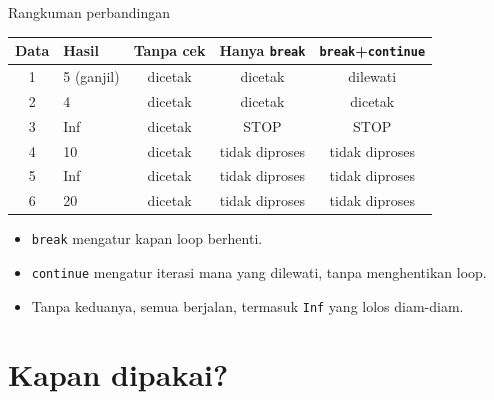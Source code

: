 \documentclass[aspectratio=169,10pt]{beamer}
\newcommand{\kode}[1]{\texttt{#1}}
\begin{document}
\begin{frame}[fragile]{Rangkuman perbandingan}
  \centering
  \begin{tabular}{@{}clccc@{}}
    \toprule
    Data & Hasil & Tanpa cek & Hanya \kode{break} & \kode{break}+\kode{continue} \\
    \midrule
    1 & 5 (ganjil) & dicetak & dicetak & \alert{dilewati} \\
    2 & 4          & dicetak & dicetak & dicetak \\
    3 & Inf        & dicetak & \alert{STOP} & \alert{STOP} \\
    4 & 10         & dicetak & tidak diproses & tidak diproses \\
    5 & Inf        & dicetak & tidak diproses & tidak diproses \\
    6 & 20         & dicetak & tidak diproses & tidak diproses \\
    \bottomrule
  \end{tabular}

  \vspace{10pt}
  \raggedright
  \begin{itemize}
    \item \kode{break} mengatur \alert{kapan loop berhenti}.
    \item \kode{continue} mengatur \alert{iterasi mana yang dilewati}, tanpa menghentikan loop.
    \item Tanpa keduanya, semua berjalan, termasuk \kode{Inf} yang lolos diam-diam.
  \end{itemize}
\end{frame}

\section{Kapan dipakai?}
\end{document}

